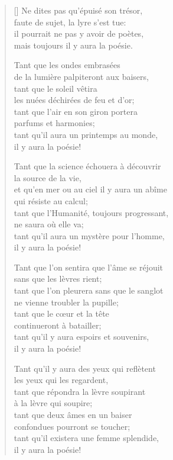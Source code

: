 \documentclass[a4paper,12pt]{book}
\begin{document}
\begin{verse}[\versewidth]
  Ne dites pas qu'épuisé son trésor, \\
  faute de sujet, la lyre s'est tue: \\
  il pourrait ne pas y avoir de poètes, \\
  mais toujours il y aura la poésie.

  Tant que les ondes embrasées \\
  de la lumière palpiteront aux baisers, \\
  tant que le soleil vêtira \\
  les nuées déchirées de feu et d'or; \\
  tant que l'air en son giron portera \\
  parfums et harmonies; \\
  tant qu'il aura un printemps au monde, \\
  il y aura la poésie!

  Tant que la science échouera à découvrir \\
  la source de la vie, \\
  et qu'en mer ou au ciel il y aura un abîme \\
  qui résiste au calcul; \\
  tant que l'Humanité, toujours progressant, \\
  ne saura où elle va; \\
  tant qu'il aura un mystère pour l'homme, \\
  il y aura la poésie!

  Tant que l'on sentira que l'âme se réjouit \\
  sans que les lèvres rient; \\
  tant que l'on pleurera sans que le sanglot \\
  ne vienne troubler la pupille; \\
  tant que le c{\oe}ur et la tête \\
  continueront à batailler; \\
  tant qu'il y aura espoirs et souvenirs, \\
  il y aura la poésie!

  Tant qu'il y aura des yeux qui reflètent \\
  les yeux qui les regardent, \\
  tant que répondra la lèvre soupirant \\
  à la lèvre qui soupire; \\
  tant que deux âmes en un baiser \\
  confondues pourront se toucher; \\
  tant qu'il existera une femme splendide, \\
  il y aura la poésie!
\end{verse}
\end{document}
